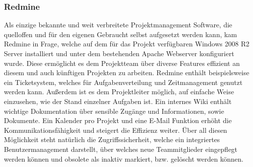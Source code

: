		\subsubsection{Redmine}
			Als einzige bekannte und weit verbreitete Projektmanagement Software, die
			quelloffen und für den eigenen Gebraucht selbst aufgesetzt werden kann, kam
			Redmine in Frage, welche auf dem für das Projekt verfügbaren Windows 2008 R2
			Server installiert und unter dem bestehenden Apache Webserver konfiguriert
			wurde. Diese ermöglicht es dem Projektteam über diverse Features effizient
			an diesem und auch künftigen Projekten zu arbeiten. Redmine enthält
			beispielsweise ein Ticketsystem, welches für Aufgabenverteilung und
			Zeitmanagement genutzt werden kann. Außerdem ist es dem Projektleiter
			möglich, auf einfache Weise einzusehen, wie der Stand einzelner Aufgaben
			ist. Ein internes Wiki enthält wichtige Dokumentation über sensible Zugänge
			und Informationen, sowie Dokumente. Ein Kalender pro Projekt und eine E-Mail
			Funktion erhöht die Kommunikationsfähigkeit und steigert die Effizienz
			weiter. Über all diesen Möglichkeit steht natürlich die Zugriffssicherheit,
			welche ein integriertes Benutzermanagement darstellt, über welches neue
			Teammitglieder eingepflegt werden können und obsolete als inaktiv markiert,
			bzw. gelöscht werden können.
